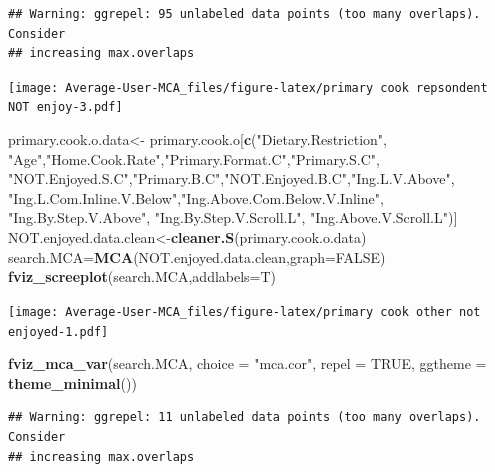 \documentclass[
]{article}
\newenvironment{Shaded}{\begin{snugshade}}{\end{snugshade}}
\newcommand{\DataTypeTok}[1]{\textcolor[rgb]{0.13,0.29,0.53}{#1}}
\newcommand{\KeywordTok}[1]{\textcolor[rgb]{0.13,0.29,0.53}{\textbf{#1}}}
\newcommand{\NormalTok}[1]{#1}
\newcommand{\OtherTok}[1]{\textcolor[rgb]{0.56,0.35,0.01}{#1}}
\newcommand{\StringTok}[1]{\textcolor[rgb]{0.31,0.60,0.02}{#1}}
\begin{document}
\begin{verbatim}
## Warning: ggrepel: 95 unlabeled data points (too many overlaps). Consider
## increasing max.overlaps
\end{verbatim}

\texttt{[image: Average-User-MCA\_files/figure-latex/primary cook repsondent NOT enjoy-3.pdf]}

\begin{Shaded}
\begin{Highlighting}[]
\NormalTok{primary.cook.o.data<-}\StringTok{ }\NormalTok{primary.cook.o[}\KeywordTok{c}\NormalTok{(}\StringTok{"Dietary.Restriction"}\NormalTok{, }\StringTok{"Age"}\NormalTok{,}\StringTok{"Home.Cook.Rate"}\NormalTok{,}\StringTok{"Primary.Format.C"}\NormalTok{,}\StringTok{"Primary.S.C"}\NormalTok{,}
            \StringTok{"NOT.Enjoyed.S.C"}\NormalTok{,}\StringTok{"Primary.B.C"}\NormalTok{,}\StringTok{"NOT.Enjoyed.B.C"}\NormalTok{,}\StringTok{"Ing.L.V.Above"}\NormalTok{,}
            \StringTok{"Ing.L.Com.Inline.V.Below"}\NormalTok{,}\StringTok{"Ing.Above.Com.Below.V.Inline"}\NormalTok{,  }\StringTok{"Ing.By.Step.V.Above"}\NormalTok{,  }\StringTok{"Ing.By.Step.V.Scroll.L"}\NormalTok{,}
            \StringTok{"Ing.Above.V.Scroll.L"}\NormalTok{)]}
\NormalTok{NOT.enjoyed.data.clean<-}\KeywordTok{cleaner.S}\NormalTok{(primary.cook.o.data)}
\NormalTok{search.MCA=}\KeywordTok{MCA}\NormalTok{(NOT.enjoyed.data.clean,}\DataTypeTok{graph=}\OtherTok{FALSE}\NormalTok{)}
\KeywordTok{fviz_screeplot}\NormalTok{(search.MCA,}\DataTypeTok{addlabels=}\NormalTok{T)}
\end{Highlighting}
\end{Shaded}

\texttt{[image: Average-User-MCA\_files/figure-latex/primary cook other not enjoyed-1.pdf]}

\begin{Shaded}
\begin{Highlighting}[]
\KeywordTok{fviz_mca_var}\NormalTok{(search.MCA, }\DataTypeTok{choice =} \StringTok{"mca.cor"}\NormalTok{, }\DataTypeTok{repel =} \OtherTok{TRUE}\NormalTok{,}
             \DataTypeTok{ggtheme =} \KeywordTok{theme_minimal}\NormalTok{())}
\end{Highlighting}
\end{Shaded}

\begin{verbatim}
## Warning: ggrepel: 11 unlabeled data points (too many overlaps). Consider
## increasing max.overlaps
\end{verbatim}
\end{document}
